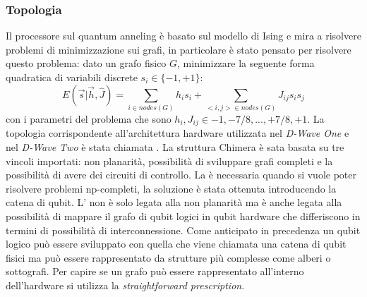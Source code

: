 \subsubsection{Topologia}
Il processore sul quantum anneling è basato sul modello di Ising e mira a risolvere problemi di minimizzazione sui grafi, in particolare è stato pensato per risolvere questo problema: dato un grafo fisico $G$, minimizzare la seguente forma quadratica di variabili discrete $s_i \in \{-1, +1\}$:
$$E(\vec{s}|\vec{h}, \hat{J}) = \sum_{i \in nodes(G)} h_i s_i + \sum_{<i,j> \in nodes(G)} J_{ij} s_i s_j$$
con i parametri del problema che sono $h_i, J_{ij} \in {-1, -7/8, ..., +7/8, +1}$. La topologia corrispondente all'architettura hardware utilizzata nel \textit{D-Wave One} e nel \textit{D-Wave Two} è stata chiamata . La struttura Chimera è sata basata su tre vincoli importati: non planarità, possibilità di sviluppare grafi completi e la possibilità di avere dei circuiti di controllo. La  è necessaria quando si vuole poter risolvere problemi np-completi, la soluzione è stata ottenuta introducendo la catena di qubit. L' non è solo legata alla non planarità ma è anche legata alla possibilità di mappare il grafo di qubit logici in qubit hardware che differiscono in termini di possibilità di interconnessione. Come anticipato in precedenza un qubit logico può essere sviluppato con quella che viene chiamata una catena di qubit fisici ma può essere rappresentato da strutture più complesse come alberi o sottografi. Per capire se un grafo può essere rappresentato all'interno dell'hardware si utilizza la \textit{straightforward prescription}.
